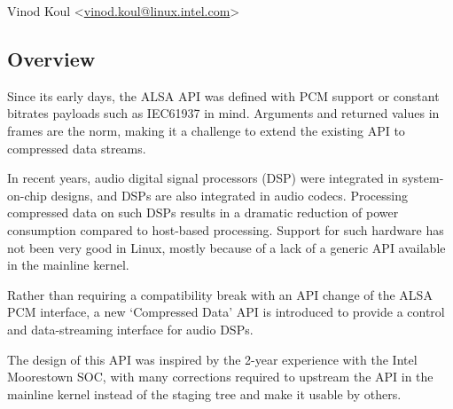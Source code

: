 \documentclass[a4paper,8pt,english]{sphinxmanual}
\begin{document}
Vinod Koul \textless{}\href{mailto:vinod.koul@linux.intel.com}{vinod.koul@linux.intel.com}\textgreater{}


\subsection{Overview}
\label{sound/designs/compress-offload:overview}
Since its early days, the ALSA API was defined with PCM support or
constant bitrates payloads such as IEC61937 in mind. Arguments and
returned values in frames are the norm, making it a challenge to
extend the existing API to compressed data streams.

In recent years, audio digital signal processors (DSP) were integrated
in system-on-chip designs, and DSPs are also integrated in audio
codecs. Processing compressed data on such DSPs results in a dramatic
reduction of power consumption compared to host-based
processing. Support for such hardware has not been very good in Linux,
mostly because of a lack of a generic API available in the mainline
kernel.

Rather than requiring a compatibility break with an API change of the
ALSA PCM interface, a new `Compressed Data' API is introduced to
provide a control and data-streaming interface for audio DSPs.

The design of this API was inspired by the 2-year experience with the
Intel Moorestown SOC, with many corrections required to upstream the
API in the mainline kernel instead of the staging tree and make it
usable by others.
\end{document}
